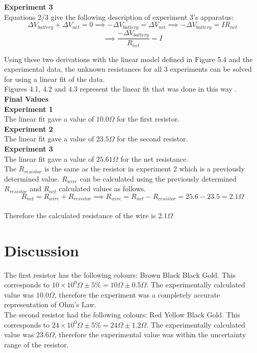 \documentclass[
	letterpaper, %
	12pt, %
]{CSUniSchoolLabReport}
\begin{document}
\textbf{Experiment 3}\\
Equations 2/3 give the following description of experiment 3's apparatus:
$$\Delta V_{battery} + \Delta V_{net} = 0 \implies -\Delta V_{battery} = \Delta V_{net} \implies -\Delta V_{battery} = IR_{net} $$
$$\implies \frac{-\Delta V_{battery}}{R_{net}} = I$$

Using these two derivations with the linear model defined in Figure 5.4 and the experimental data, the unknown resistances for all 3 experiments can be solved for using a linear fit of the data.\\
Figures 4.1, 4.2 and 4.3 represent the linear fit that was done in this way .\\

{\large\textbf{Final Values}}\\

\textbf{Experiment 1}\\
The linear fit gave a value of $10.0\Omega$ for the first resistor.\\

\textbf{Experiment 2}\\
The linear fit gave a value of $23.5\Omega$ for the second resistor.\\

\textbf{Experiment 3}\\
The linear fit gave a value of $25.61\Omega$ for the net resistance.\\
The $R_{resistor}$ is the same as the resistor in experiment 2 which is a previously determined value. $R_{wire}$ can be calculated using the previously determined $R_{resistor}$ and $R_{net}$ calculated values as follows.
$$R_{net} = R_{wire} + R_{resistor} \implies R_{wire} = R_{net} - R_{resistor} = 25.6 - 23.5 = 2.1\Omega$$\\
Therefore the calculated resistance of the wire is $2.1\Omega$
\section{Discussion}
The first resistor has the following colours: Brown Black Black Gold. This corresponds to $10\times 10^0\Omega \pm 5\% = 10\Omega\pm0.5\Omega$. The experimentally calculated value was $10.0\Omega$, therefore the experiment was a completely accurate representation of Ohm's Law.\\

The second resistor had the following colours: Red Yellow Black Gold. This corresponds to $24\times10^0 \Omega \pm 5\% = 24\Omega\pm 1.2\Omega$. The experimentally calculated value was $23.6\Omega$, therefore the experimental value was within the uncertainty range of the resistor.\\
\newpage
\end{document}
